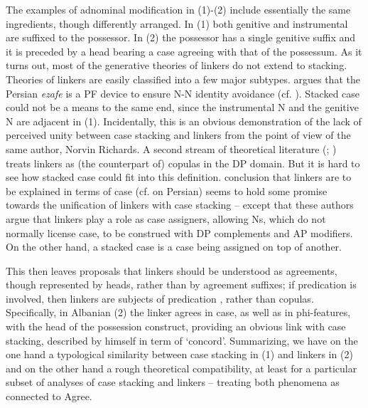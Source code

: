 \documentclass[output=paper]{langsci/langscibook}
\begin{document}
The examples of adnominal modification in (1)-(2) include essentially the same ingredients, though differently arranged. In (1) both genitive and instrumental are suffixed to the possessor. In (2) the possessor has a single genitive suffix and it is preceded by a head bearing a case agreeing with that of the possessum. As it turns out, most of the generative theories of linkers do not extend to stacking. Theories of linkers are easily classified into a few major subtypes. \citet{Richards2010} argues that the Persian \textit{ezafe} is a PF device to ensure N-N identity avoidance (cf. \citealt{Ghomeshi1997}). Stacked case could not be a means to the same end, since the instrumental N and the genitive N are adjacent in (1). Incidentally, this is an obvious demonstration of the lack of perceived unity between case stacking and linkers from the point of view of the same author, Norvin Richards. A second stream of theoretical literature (\citealt{Dikken2004}; \citealt{Campos2005}) treats linkers as (the counterpart of) copulas in the DP domain. But it is hard to see how stacked case could fit into this definition.  conclusion that linkers are to be explained in terms of case (cf. \citealt{Samiian1994} on Persian) seems to hold some promise towards the unification of linkers with case stacking – except that these authors argue that linkers play a role as case assigners, allowing Ns, which do not normally license case, to be construed with DP complements and AP modifiers. On the other hand, a stacked case is a case being assigned on top of another. 

This then leaves proposals \citep{Philip2012} that linkers should be understood as agreements, though represented by heads, rather than by agreement suffixes; if predication is involved, then linkers are subjects of predication \citep{Franco2015}, rather than copulas. Specifically, in Albanian (2) the linker agrees in case, as well as in phi-features, with the head of the possession construct, providing an obvious link with case stacking, described by \citet{Richards2013} himself in term of ‘concord’. Summarizing, we have on the one hand a typological similarity between case stacking in (1) and linkers in (2) and on the other hand a rough theoretical compatibility, at least for a particular subset of analyses of case stacking and linkers – treating both phenomena as connected to Agree. 
\end{document}

